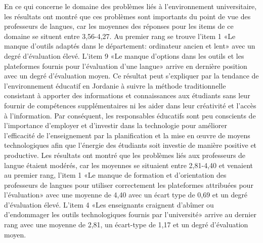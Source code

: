 \documentclass[french]{textolivre}
\begin{document}
En ce qui concerne le domaine des problèmes liés à l'environnement universitaire, les résultats ont montré que ces problèmes sont importants du point de vue des professeurs de langues, car les moyennes des réponses pour les items de ce domaine se situent entre 3,56-4,27. Au premier rang se trouve l’item 1 «Le manque d'outils adaptés dans le département: ordinateur ancien et lent» avec un degré d'évaluation élevé. L’item 9 «Le manque d'options dans les outils et les plateformes fournis pour l'évaluation d'une langue» arrive en dernière position avec un degré d'évaluation moyen. Ce résultat peut s'expliquer par la tendance de l'environnement éducatif en Jordanie à suivre la méthode traditionnelle consistant à apporter des informations et connaissances aux étudiants sans leur fournir de compétences supplémentaires ni les aider dans leur créativité et l'accès à l'information. Par conséquent, les responsables éducatifs sont peu conscients de l'importance d'employer et d'investir dans la technologie pour améliorer l'efficacité de l’enseignement par la planification et la mise en œuvre de moyens technologiques afin que l’énergie des étudiants soit investie de manière positive et productive. Les résultats ont montré que les problèmes liés aux professeurs de langue étaient modérés, car les moyennes se situaient entre 2,81-4,40 et venaient au premier rang, l’item 1 «Le manque de formation et d'orientation des professeurs de langues pour utiliser correctement les plateformes attribuées pour l'évaluation» avec une moyenne de 4,40 avec un écart type de 0,69 et un degré d'évaluation élevé. L’item 4 «Les enseignants craignent d’abîmer ou d'endommager les outils technologiques fournis par l'université» arrive au dernier rang avec une moyenne de 2,81, un écart-type de 1,17 et un degré d'évaluation moyen.
\end{document}
